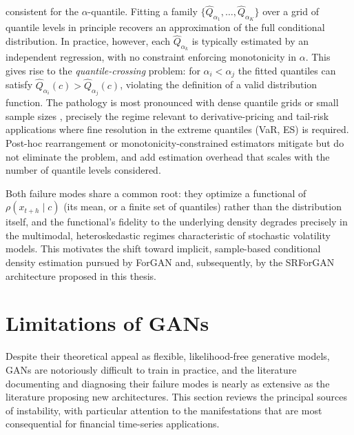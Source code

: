 consistent for the $\alpha$-quantile. 
Fitting a family $\{\hat{Q}_{\alpha_1}, \dots, \hat{Q}_{\alpha_K}\}$ over a grid of 
quantile levels in principle recovers an approximation 
of the full conditional distribution. 
In practice, however, each $\hat{Q}_{\alpha_k}$ 
is typically estimated by an independent regression, 
with no constraint enforcing monotonicity in $\alpha$. 
This gives rise to the \emph{quantile-crossing} problem: 
for $\alpha_i < \alpha_j$ the fitted quantiles 
can satisfy $\hat{Q}_{\alpha_i}(c) > \hat{Q}_{\alpha_j}(c)$, 
violating the definition of a valid distribution function. 
The pathology is most pronounced with dense quantile grids or 
small sample sizes \cite{background:mean_regression}, 
precisely the regime relevant to derivative-pricing 
and tail-risk applications where fine resolution in 
the extreme quantiles (VaR, ES) is required. Post-hoc 
rearrangement or monotonicity-constrained estimators 
\cite{background:quantile_regression2,background:quantile_regression3} 
mitigate but do not eliminate the problem, and add 
estimation overhead that scales with the number of 
quantile levels considered.

Both failure modes share a common root: 
they optimize a functional of $\rho(x_{t+h}\mid c)$ 
(its mean, or a finite set of quantiles) 
rather than the distribution itself, 
and the functional's fidelity to the 
underlying density degrades precisely in 
the multimodal, heteroskedastic regimes characteristic 
of stochastic volatility models. 
This motivates the shift toward implicit, 
sample-based conditional density estimation 
pursued by ForGAN and, subsequently, 
by the SRForGAN architecture proposed in this thesis.




\section{Limitations of GANs}
\label{sec:limitations-gans}
Despite their theoretical appeal as flexible, likelihood-free generative models, GANs are notoriously difficult to train in practice, and the literature documenting and diagnosing their failure modes is nearly as extensive as the literature proposing new architectures. This section reviews the principal sources of instability, with particular attention to the manifestations that are most consequential for financial time-series applications.\\

